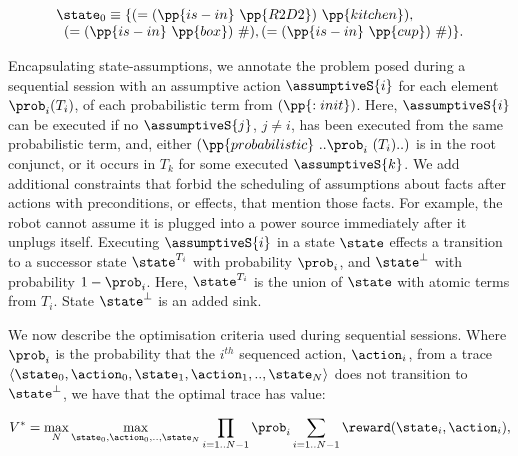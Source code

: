 \small
\[
\begin{array}{l}
\state_0 \equiv \{(=(\pp{is-in}~\pp{R2D2})~\pp{kitchen}),\\
\;\;(=(\pp{is-in}~\pp{box})~\#), (=(\pp{is-in}~\pp{cup})~\#)\}.
\end{array}
\]
\normalsize

Encapsulating state-assumptions, we annotate the problem posed during
a sequential session with an assumptive action $\assumptiveS{i}$ for
each element $\prob_i (T_i)$, of each probabilistic term from
$(\pp{:init})$. Here, $\assumptiveS{i}$ can be executed if no
$\assumptiveS{j}$, $j \neq i$, has been executed from the same
probabilistic term, and, either
$(\pp{probabilistic}~..\prob_i~(T_i)..)$ is in the root conjunct, or
it occurs in $T_k$ for some executed $\assumptiveS{k}$.
We add additional constraints that forbid the scheduling of
assumptions about facts after actions with preconditions, or effects,
that mention those facts. For example, the robot cannot assume it is
plugged into a power source immediately after it unplugs itself.
Executing $\assumptiveS{i}$ in a state $\state$ effects a transition
to a successor state $\state^{T_i}$ with probability $\prob_i$, and
$\state^\bot$ with probability $1 - \prob_i$. Here, $\state^{T_i}$ is
the union of $\state$ with atomic terms from $T_i$. State
$\state^\bot$ is an added sink.


We now describe the optimisation criteria used during sequential
sessions. Where $\prob_i$ is the probability that the $i^{th}$
sequenced action, $\action_i$, from a trace
$\langle \state_0, \action_0,\state_1, \action_1,.., \state_N \rangle$
does not transition to $\state^\bot$, we have that the optimal trace
has value:




\small
\[
V^* = \max_N \max_{\state_0, \action_0,.., \state_N} \prod_{i=1..N-1} \prob_i \sum_{i=1..N-1}
\reward(\state_i, \action_i),
\]
\normalsize

